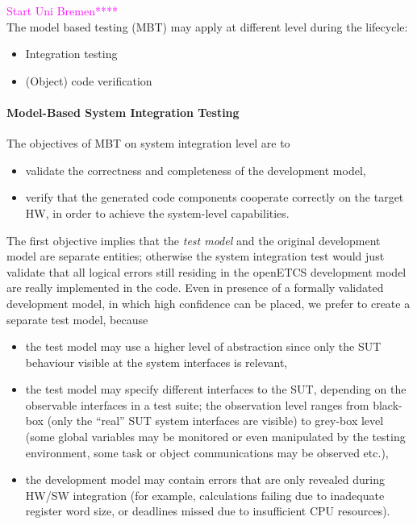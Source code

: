 \documentclass{template/openetcs_report}
\begin{document}
\textcolor{magenta}{Start Uni Bremen****\\ }
 The model based testing (MBT) may apply at different level during the
lifecycle:
\begin{itemize}
\item Integration testing
\item (Object) code verification
\end{itemize}
\paragraph{Model-Based System Integration Testing}
The objectives of MBT on system integration level are to
\begin{itemize}
\item validate the correctness and completeness of the development model,
\item verify that the generated code components cooperate correctly on the target HW, in 
order to achieve the system-level capabilities.
\end{itemize}

The first objective implies that the {\it test model} and the original development model are
separate entities; otherwise the system integration test would just validate that all logical
errors still residing in the openETCS development model are really implemented in the code. Even in presence
of a formally validated development model, in which high confidence can be placed, we prefer to create a 
separate test model, because
\begin{itemize}
\item the test model may use a higher level of abstraction since only the SUT behaviour visible at the 
system interfaces is relevant,

\item the test model may specify different interfaces to the SUT, depending on the observable interfaces
in a test suite; the observation level ranges from black-box (only the ``real'' SUT system interfaces
are visible) to grey-box level (some global variables may be monitored or even manipulated by the testing environment, some task or object communications may be observed etc.),  

\item the development model may contain errors that are only revealed during HW/SW integration (for example, calculations failing due to inadequate register word size, or deadlines missed due to insufficient CPU resources).
\end{itemize}
\end{document}
